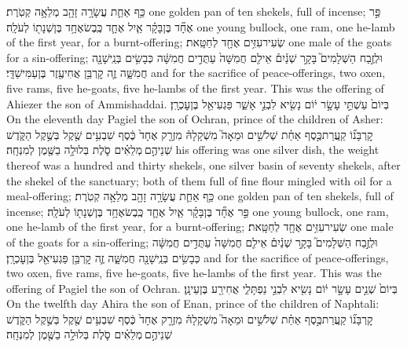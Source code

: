 \documentclass[11pt, openany]{book}
\begin{document}
{כַּ֥ף אַחַ֛ת עֲשָׂרָ֥ה זָהָ֖ב מְלֵאָ֥ה קְטֹֽרֶת׃}
{one golden pan of ten shekels, full of incense;}
{פַּ֣ר אֶחָ֞ד בֶּן\maqqaf בָּקָ֗ר אַ֧יִל אֶחָ֛ד כֶּֽבֶשׂ\maqqaf אֶחָ֥ד בֶּן\maqqaf שְׁנָת֖וֹ לְעֹלָֽה׃}
{one young bullock, one ram, one he-lamb of the first year, for a burnt-offering;}
{שְׂעִיר\maqqaf עִזִּ֥ים אֶחָ֖ד לְחַטָּֽאת׃}
{one male of the goats for a sin-offering;}
{וּלְזֶ֣בַח הַשְּׁלָמִים֮ בָּקָ֣ר שְׁנַ֒יִם֒ אֵילִ֤ם חֲמִשָּׁה֙ עַתֻּדִ֣ים חֲמִשָּׁ֔ה כְּבָשִׂ֥ים בְּנֵֽי\maqqaf שָׁנָ֖ה חֲמִשָּׁ֑ה זֶ֛ה קׇרְבַּ֥ן אֲחִיעֶ֖זֶר בֶּן\maqqaf עַמִּישַׁדָּֽי׃ \petucha }
{and for the sacrifice of peace-offerings, two oxen, five rams, five he-goats, five he-lambs of the first year. This was the offering of Ahiezer the son of Ammishaddai.}
{בְּיוֹם֙ עַשְׁתֵּ֣י עָשָׂ֣ר י֔וֹם נָשִׂ֖יא לִבְנֵ֣י אָשֵׁ֑ר פַּגְעִיאֵ֖ל בֶּן\maqqaf עׇכְרָֽן׃}
{On the eleventh day Pagiel the son of Ochran, prince of the children of Asher:}
{קׇרְבָּנ֞וֹ קַֽעֲרַת\maqqaf כֶּ֣סֶף אַחַ֗ת שְׁלֹשִׁ֣ים וּמֵאָה֮ מִשְׁקָלָהּ֒ מִזְרָ֤ק אֶחָד֙ כֶּ֔סֶף שִׁבְעִ֥ים שֶׁ֖קֶל בְּשֶׁ֣קֶל הַקֹּ֑דֶשׁ שְׁנֵיהֶ֣ם \legarmeh  מְלֵאִ֗ים סֹ֛לֶת בְּלוּלָ֥ה בַשֶּׁ֖מֶן לְמִנְחָֽה׃}
{his offering was one silver dish, the weight thereof was a hundred and thirty shekels, one silver basin of seventy shekels, after the shekel of the sanctuary; both of them full of fine flour mingled with oil for a meal-offering;}
{כַּ֥ף אַחַ֛ת עֲשָׂרָ֥ה זָהָ֖ב מְלֵאָ֥ה קְטֹֽרֶת׃}
{one golden pan of ten shekels, full of incense;}
{פַּ֣ר אֶחָ֞ד בֶּן\maqqaf בָּקָ֗ר אַ֧יִל אֶחָ֛ד כֶּֽבֶשׂ\maqqaf אֶחָ֥ד בֶּן\maqqaf שְׁנָת֖וֹ לְעֹלָֽה׃}
{one young bullock, one ram, one he-lamb of the first year, for a burnt-offering;}
{שְׂעִיר\maqqaf עִזִּ֥ים אֶחָ֖ד לְחַטָּֽאת׃}
{one male of the goats for a sin-offering;}
{וּלְזֶ֣בַח הַשְּׁלָמִים֮ בָּקָ֣ר שְׁנַ֒יִם֒ אֵילִ֤ם חֲמִשָּׁה֙ עַתֻּדִ֣ים חֲמִשָּׁ֔ה כְּבָשִׂ֥ים בְּנֵֽי\maqqaf שָׁנָ֖ה חֲמִשָּׁ֑ה זֶ֛ה קׇרְבַּ֥ן פַּגְעִיאֵ֖ל בֶּן\maqqaf עׇכְרָֽן׃ \petucha }
{and for the sacrifice of peace-offerings, two oxen, five rams, five he-goats, five he-lambs of the first year. This was the offering of Pagiel the son of Ochran.}
{בְּיוֹם֙ שְׁנֵ֣ים עָשָׂ֣ר י֔וֹם נָשִׂ֖יא לִבְנֵ֣י נַפְתָּלִ֑י אֲחִירַ֖ע בֶּן\maqqaf עֵינָֽן׃}
{On the twelfth day Ahira the son of Enan, prince of the children of Naphtali:}
{קׇרְבָּנ֞וֹ קַֽעֲרַת\maqqaf כֶּ֣סֶף אַחַ֗ת שְׁלֹשִׁ֣ים וּמֵאָה֮ מִשְׁקָלָהּ֒ מִזְרָ֤ק אֶחָד֙ כֶּ֔סֶף שִׁבְעִ֥ים שֶׁ֖קֶל בְּשֶׁ֣קֶל הַקֹּ֑דֶשׁ שְׁנֵיהֶ֣ם \legarmeh  מְלֵאִ֗ים סֹ֛לֶת בְּלוּלָ֥ה בַשֶּׁ֖מֶן לְמִנְחָֽה׃}
\end{document}
